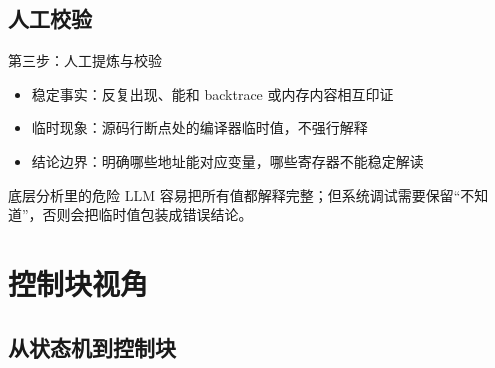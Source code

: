 \documentclass[aspectratio=169,11pt]{beamer}
\begin{document}
\subsection{人工校验}

\begin{frame}{第三步：人工提炼与校验}
  \begin{itemize}
    \item 稳定事实：反复出现、能和 backtrace 或内存内容相互印证
    \item 临时现象：源码行断点处的编译器临时值，不强行解释
    \item 结论边界：明确哪些地址能对应变量，哪些寄存器不能稳定解读
  \end{itemize}

  \vspace{0.6em}
  \begin{alertblock}{底层分析里的危险}
    LLM 容易把所有值都解释完整；但系统调试需要保留“不知道”，否则会把临时值包装成错误结论。
  \end{alertblock}
\end{frame}

\section{控制块视角}
\subsection{从状态机到控制块}
\end{document}
